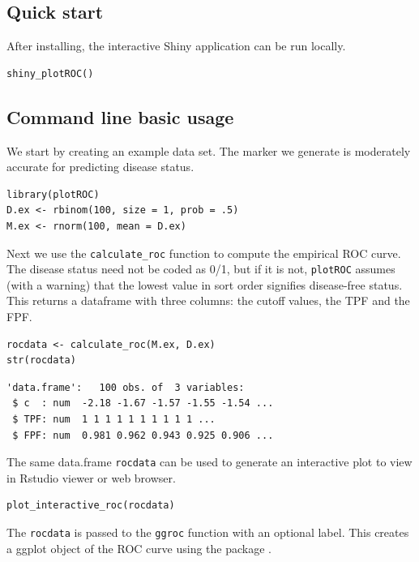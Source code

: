\documentclass[article]{jss}
\begin{document}
\subsection{Quick start}\label{quick-start}

After installing, the interactive Shiny application can be run locally.

\begin{verbatim}
shiny_plotROC()
\end{verbatim}

\subsection{Command line basic usage}\label{command-line-basic-usage}

We start by creating an example data set. The marker we generate is
moderately accurate for predicting disease status.

\begin{verbatim}
library(plotROC)
D.ex <- rbinom(100, size = 1, prob = .5)
M.ex <- rnorm(100, mean = D.ex)
\end{verbatim}

Next we use the \texttt{calculate\_roc} function to compute the
empirical ROC curve. The disease status need not be coded as 0/1, but if
it is not, \texttt{plotROC} assumes (with a warning) that the lowest
value in sort order signifies disease-free status. This returns a
dataframe with three columns: the cutoff values, the TPF and the FPF.

\begin{verbatim}
rocdata <- calculate_roc(M.ex, D.ex)
str(rocdata)
\end{verbatim}

\begin{verbatim}
'data.frame':   100 obs. of  3 variables:
 $ c  : num  -2.18 -1.67 -1.57 -1.55 -1.54 ...
 $ TPF: num  1 1 1 1 1 1 1 1 1 1 ...
 $ FPF: num  0.981 0.962 0.943 0.925 0.906 ...
\end{verbatim}

The same data.frame \texttt{rocdata} can be used to generate an
interactive plot to view in Rstudio viewer or web browser.

\begin{verbatim}
plot_interactive_roc(rocdata)
\end{verbatim}

The \texttt{rocdata} is passed to the \texttt{ggroc} function with an
optional label. This creates a ggplot object of the ROC curve using the
 package \citep{ggplot2}.
\end{document}
